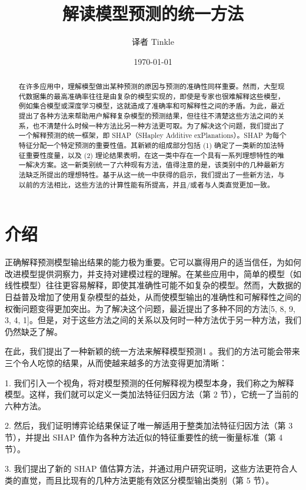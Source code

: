\documentclass[12pt, a4paper]{ctexart} %
\title{解读模型预测的统一方法}
\author{译者 Tinkle}
\date{\today}
\begin{document}
\maketitle{}
\begin{abstract}
    在许多应用中，理解模型做出某种预测的原因与预测的准确性同样重要。然而，大型现代数据集的最高准确率往往是由复杂的模型实现的，即使是专家也很难解释这些模型，例如集合模型或深度学习模型，这就造成了准确率和可解释性之间的矛盾。为此，最近提出了各种方法来帮助用户解释复杂模型的预测结果，但往往不清楚这些方法之间的关系，也不清楚什么时候一种方法比另一种方法更可取。为了解决这个问题，我们提出了一个解释预测的统一框架，即 SHAP（SHapley Additive exPlanations）。SHAP 为每个特征分配一个特定预测的重要性值。其新颖的组成部分包括 (1) 确定了一类新的加法特征重要性度量，以及 (2) 理论结果表明，在这一类中存在一个具有一系列理想特性的唯一解决方案。这一新类别统一了六种现有方法，值得注意的是，该类别中的几种最新方法缺乏所提出的理想特性。基于从这一统一中获得的启示，我们提出了一些新方法，与以前的方法相比，这些方法的计算性能有所提高，并且/或者与人类直觉更加一致。
\end{abstract}

\section{介绍}
正确解释预测模型输出结果的能力极为重要。它可以赢得用户的适当信任，为如何改进模型提供洞察力，并支持对建模过程的理解。在某些应用中，简单的模型（如线性模型）往往更容易解释，即使其准确性可能不如复杂的模型。然而，大数据的日益普及增加了使用复杂模型的益处，从而使模型输出的准确性和可解释性之间的权衡问题变得更加突出。为了解决这个问题，最近提出了多种不同的方法[5, 8, 9, 3, 4, 1]。但是，对于这些方法之间的关系以及何时一种方法优于另一种方法，我们仍然缺乏了解。 

在此，我们提出了一种新颖的统一方法来解释模型预测1 。我们的方法可能会带来三个令人吃惊的结果，从而使越来越多的方法变得更加清晰：

1. 我们引入一个视角，将对模型预测的任何解释视为模型本身，我们称之为解释模型。这样，我们就可以定义一类加法特征归因方法（第 2 节），它统一了当前的六种方法。

2. 然后，我们证明博弈论结果保证了唯一解适用于整类加法特征归因方法（第 3 节），并提出 SHAP 值作为各种方法近似的特征重要性的统一衡量标准（第 4 节）。

3. 我们提出了新的 SHAP 值估算方法，并通过用户研究证明，这些方法更符合人类的直觉，而且比现有的几种方法更能有效区分模型输出类别（第 5 节）。
\end{document}
